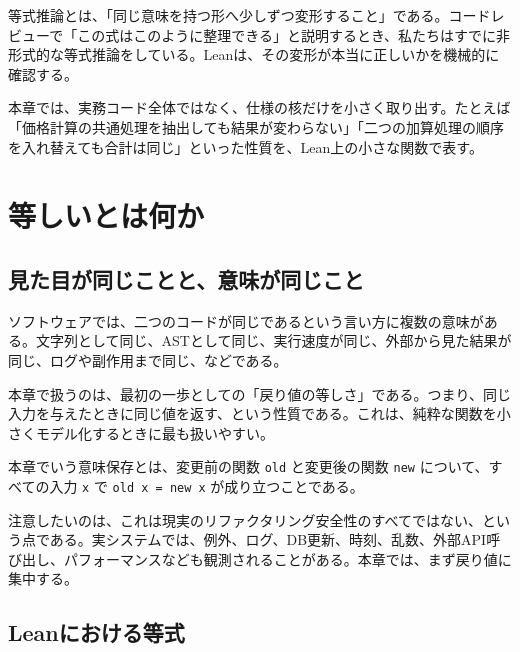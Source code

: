 \begin{intuitionbox}
等式推論とは、「同じ意味を持つ形へ少しずつ変形すること」である。コードレビューで「この式はこのように整理できる」と説明するとき、私たちはすでに非形式的な等式推論をしている。Leanは、その変形が本当に正しいかを機械的に確認する。
\end{intuitionbox}

\begin{softwarebox}
本章では、実務コード全体ではなく、仕様の核だけを小さく取り出す。たとえば「価格計算の共通処理を抽出しても結果が変わらない」「二つの加算処理の順序を入れ替えても合計は同じ」といった性質を、Lean上の小さな関数で表す。
\end{softwarebox}


\section{等しいとは何か}

\subsection{見た目が同じことと、意味が同じこと}

ソフトウェアでは、二つのコードが同じであるという言い方に複数の意味がある。文字列として同じ、ASTとして同じ、実行速度が同じ、外部から見た結果が同じ、ログや副作用まで同じ、などである。

本章で扱うのは、最初の一歩としての「戻り値の等しさ」である。つまり、同じ入力を与えたときに同じ値を返す、という性質である。これは、純粋な関数を小さくモデル化するときに最も扱いやすい。

\begin{definitionbox}
本章でいう意味保存とは、変更前の関数 \texttt{old} と変更後の関数 \texttt{new} について、すべての入力 \texttt{x} で \texttt{old x = new x} が成り立つことである。
\end{definitionbox}

注意したいのは、これは現実のリファクタリング安全性のすべてではない、という点である。実システムでは、例外、ログ、DB更新、時刻、乱数、外部API呼び出し、パフォーマンスなども観測されることがある。本章では、まず戻り値に集中する。

\subsection{Leanにおける等式}


